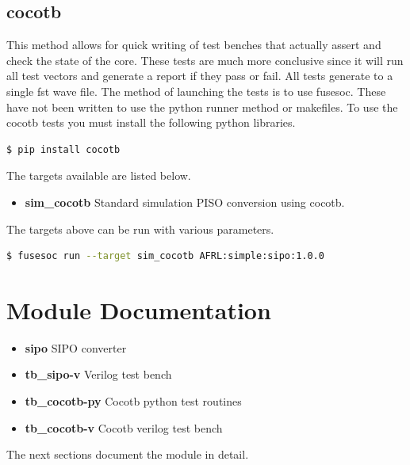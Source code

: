 \subsection{cocotb}
\par
This method allows for quick writing of test benches that actually assert and check the state of the core.
These tests are much more conclusive since it will run all test vectors and generate a report if they
pass or fail. All tests generate to a single fst wave file. The method of launching the tests is to use
fusesoc. These have not been written to use the python runner method or makefiles.
To use the cocotb tests you must install the following python libraries.
\begin{lstlisting}[language=bash]
  $ pip install cocotb
\end{lstlisting}

The targets available are listed below.
\begin{itemize}
  \item \textbf{sim\_cocotb} Standard simulation PISO conversion using cocotb.
\end{itemize}

The targets above can be run with various parameters.
\begin{lstlisting}[language=bash]
  $ fusesoc run --target sim_cocotb AFRL:simple:sipo:1.0.0
\end{lstlisting}

\newpage

\section{Module Documentation} \label{Module Documentation}

\par

\begin{itemize}
\item \textbf{sipo} SIPO converter\\
\item \textbf{tb\_sipo-v} Verilog test bench\\
\item \textbf{tb\_cocotb-py} Cocotb python test routines\\
\item \textbf{tb\_cocotb-v} Cocotb verilog test bench\\
\end{itemize}
The next sections document the module in detail.

